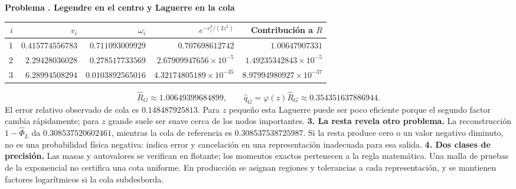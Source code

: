 \documentclass[11pt,a4paper]{article}
\theoremstyle{definition}
\newcounter{problema}
\newenvironment{resuelto}[1]{\refstepcounter{problema}\par\medskip\Needspace{6\baselineskip}\textbf{Problema \theproblema. #1}\par}{\par\medskip}
\begin{document}
\begin{resuelto}{Legendre en el centro y Laguerre en la cola}
\begin{center}\small\begin{tabular}{rrrrr}
\toprule
$i$&$v_i$&$\omega_i$&$e^{-v_i^2/(2z^2)}$&Contribución a $R$\\
\midrule
1&$0.415774556783$&$0.711093009929$&$0.707698612742$&$1.00647907331$\\
2&$2.29428036028$&$0.278517733569$&$2.67909947656\times10^{-5}$&$1.49235342843\times10^{-5}$\\
3&$6.28994508294$&$0.0103892565016$&$4.32174805189\times10^{-35}$&$8.97994980927\times10^{-37}$\\
\bottomrule\end{tabular}\end{center}
\[
\widehat R_G\approx1.00649399684899,\qquad
\widehat q_G=\varphi(z)\widehat R_G\approx0.354351637886944.
\]
El error relativo observado de cola es $0.148487925813$. Para $z$ pequeño esta Laguerre puede ser poco eficiente porque el segundo factor cambia rápidamente; para $z$ grande suele ser suave cerca de los nodos importantes.
\textbf{3. La resta revela otro problema.} La reconstrucción $1-\widehat\Phi_L$ da $0.308537520602461$, mientras la cola de referencia es $0.308537538725987$. Si la resta produce cero o un valor negativo diminuto, no es una probabilidad física negativa: indica error y cancelación en una representación inadecuada para esa salida.
\textbf{4. Dos clases de precisión.} Las masas y autovalores se verifican en flotante; los momentos exactos pertenecen a la regla matemática. Una malla de pruebas de la exponencial no certifica una cota uniforme. En producción se asignan regiones y tolerancias a cada representación, y se mantienen factores logarítmicos si la cola subdesborda.
\end{resuelto}
\end{document}
